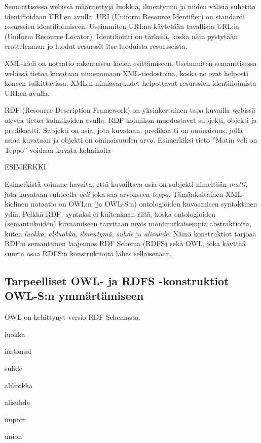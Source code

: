 \documentclass[finnish]{tktltiki2}
\theoremstyle{definition}
\theoremstyle{remark}
\begin{document}
Semanttisessa webissä määritettyjä luokkia, ilmentymiä ja niiden välisiä suhetita identifioidaan URI:en avulla\cite{semweb}.
URI (Uniform Resource Identifier) on standardi resurssien identifioimiseen. Useimmiten URI:na käytetään tavallista URL:ia (Uniform Resource Locator). Identifiointi on tärkeää, koska näin pystytään erottelemaan jo luodut resurssit itse luoduista resursseista. 

XML-kieli on notaatio rakenteisen kielen esittämiseen. Useimmiten semanttisessa webissä tietoa kuvataan nimenomaan XML-tiedostoina, koska ne ovat helposti koneen tulkittavissa. XML:n nimiavaruudet helpottavat resurssien identifioimista URI:en avulla. 

RDF (Resource Description Framework) on yksinkertainen tapa kuvailla webissä olevaa tietoa kolmikoiden avulla\cite{RDFP}. RDF-kolmikon muodostavat subjekti, objekti ja predikaatti\cite{RDFP}. Subjekti on asia, jota kuvataan, predikaatti on ominaisuus, jolla asiaa kuvataan ja objekti on ominaisuuden arvo. Esimerkiksi tieto ''Matin veli on Teppo'' voidaan kuvata kolmikolla 


ESIMERKKI


Esimerkistä voimme havaita, että kuvailtava asia on subjekti nimeltään \textit{matti}, jota kuvataan suhteella \textit{veli} joka saa arvokseen \textit{teppo}. Tämänkaltainen XML-kielinen notaatio on OWL:n (ja OWL-S:n) ontologioiden kuvaamisen syntaktinen ydin. Pelkkä RDF -syntaksi ei kuitenkaan riitä, koska ontologioiden (semantiikoiden) kuvaamiseen tarvitaan myös monimutkaisempia abstraktioita, kuten \textit{luokka}, \textit{aliluokka}, \textit{ilmentymä}, \textit{suhde} ja \textit{alisuhde}. Nämä konstruktiot tarjoaa RDF:n semanttinen laajennos RDF Schema (RDFS) sekä OWL, joka käyttää suurta osaa RDFS:n konstruktioita lähes sellaisenaan.  

\subsection{Tarpeelliset OWL- ja RDFS -konstruktiot OWL-S:n ymmärtämiseen}

OWL on kehittynyt versio RDF Schemasta. 



luokka

instanssi

suhde

aliluokka

alisuhde

import

union
\end{document}
